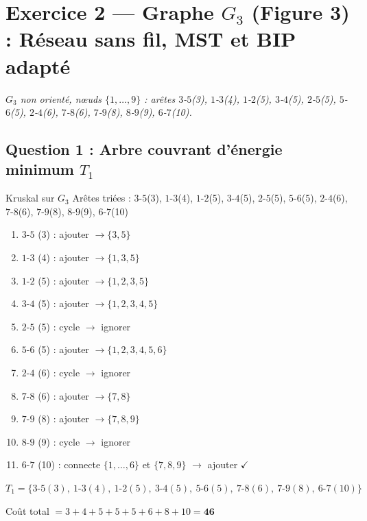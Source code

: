 \documentclass[12pt,a4paper]{article}
\begin{document}
\newpage
\section{Exercice 2 --- Graphe $G_3$ (Figure 3) : Réseau sans fil, MST et BIP adapté}

\textit{$G_3$ non orienté, nœuds $\{1,\ldots,9\}$ : arêtes $3$-$5$(3), $1$-$3$(4), $1$-$2$(5), $3$-$4$(5), $2$-$5$(5), $5$-$6$(5), $2$-$4$(6), $7$-$8$(6), $7$-$9$(8), $8$-$9$(9), $6$-$7$(10).}

\subsection{Question 1 : Arbre couvrant d'énergie minimum $T_1$}

\begin{etape}{Kruskal sur $G_3$}
Arêtes triées : $3$-$5$(3), $1$-$3$(4), $1$-$2$(5), $3$-$4$(5), $2$-$5$(5), $5$-$6$(5), $2$-$4$(6), $7$-$8$(6), $7$-$9$(8), $8$-$9$(9), $6$-$7$(10)

\begin{enumerate}
    \item $3$-$5$ (3) : ajouter $\to \{3,5\}$
    \item $1$-$3$ (4) : ajouter $\to \{1,3,5\}$
    \item $1$-$2$ (5) : ajouter $\to \{1,2,3,5\}$
    \item $3$-$4$ (5) : ajouter $\to \{1,2,3,4,5\}$
    \item $2$-$5$ (5) : cycle $\to$ ignorer
    \item $5$-$6$ (5) : ajouter $\to \{1,2,3,4,5,6\}$
    \item $2$-$4$ (6) : cycle $\to$ ignorer
    \item $7$-$8$ (6) : ajouter $\to \{7,8\}$
    \item $7$-$9$ (8) : ajouter $\to \{7,8,9\}$
    \item $8$-$9$ (9) : cycle $\to$ ignorer
    \item $6$-$7$ (10) : connecte $\{1,\ldots,6\}$ et $\{7,8,9\}$ $\to$ ajouter $\checkmark$
\end{enumerate}
\end{etape}

\begin{resultat}
$T_1 = \{3\text{-}5(3),\ 1\text{-}3(4),\ 1\text{-}2(5),\ 3\text{-}4(5),\ 5\text{-}6(5),\ 7\text{-}8(6),\ 7\text{-}9(8),\ 6\text{-}7(10)\}$

Coût total $= 3+4+5+5+5+6+8+10 = \mathbf{46}$
\end{resultat}
\end{document}

